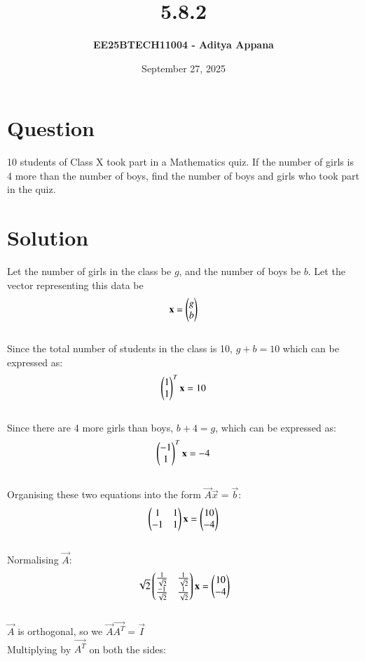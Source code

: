 \documentclass[12pt]{article}
\title{\textbf{5.8.2}}
\author{\textbf{EE25BTECH11004 - Aditya Appana}}
\date{September 27, 2025}
\begin{document}
\maketitle

\section*{Question}
10 students of Class X took part in a Mathematics quiz. If the number of girls is 4
more than the number of boys, find the number of boys and girls who took part in
the quiz.

\section*{Solution}

Let the number of girls in the class be $g$, and the number of boys be $b$. Let the vector representing this data be 
\begin{align}
\mathbf{x} = \begin{pmatrix}g\\b\end{pmatrix}    
\end{align}\\
Since the total number of students in the class is 10, $g+b=10$ which can be expressed as:
\begin{align}
\begin{pmatrix}1\\1\end{pmatrix}^T\mathbf{x} = 10
\end{align}\\
Since there are 4 more girls than boys, $b+4=g$, which can be expressed as:
\begin{align}
\begin{pmatrix}-1 \\ 1\end{pmatrix}^T\mathbf{x} = -4
\end{align}\\
Organising these two equations into the form $\vec{A}\vec{x} = \vec{b}$:
\begin{align}
\begin{pmatrix}1&1 \\ -1&1\end{pmatrix} \mathbf{x} = \begin{pmatrix}10\\-4\end{pmatrix}
\end{align}\\
Normalising $\vec{A}$: 
\begin{align}
\sqrt{2} \begin{pmatrix}\frac{1}{\sqrt{2}} & \frac{1}{\sqrt{2}} \\  \frac{-1}{\sqrt{2}}& \frac{1}{\sqrt{2}}\end{pmatrix} \mathbf{x} = \begin{pmatrix}10\\-4\end{pmatrix}
\end{align}\\
$\vec{A}$ is orthogonal, so we $\vec{A}\vec{A^T} = \vec{I}$\\
Multiplying by $\vec{A^T}$ on both the sides:
\end{document}
